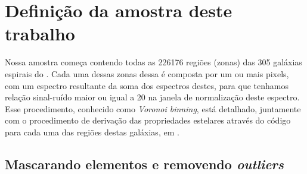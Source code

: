 \section{Definição da amostra deste trabalho}
\label{sec:amostra:definicao}

Nossa amostra começa contendo todas as 226176 regiões (zonas) das 305 galáxias espirais do \CAL.
Cada uma dessas zonas dessa é composta por um ou mais pixels, com um espectro resultante da soma dos
espectros destes, para que tenhamos relação sinal-ruído maior ou igual a 20 na janela de
normalização deste espectro. Esse procedimento, conhecido como {\em Voronoi binning}, está
detalhado, juntamente com o procedimento de derivação das propriedades estelares através do código
\starlight para cada uma das regiões destas galáxias, em \citet{CidFernandes.etal.2013a}.

\subsection{Mascarando elementos e removendo {\em outliers}}
\label{sec:amostra:mask}

